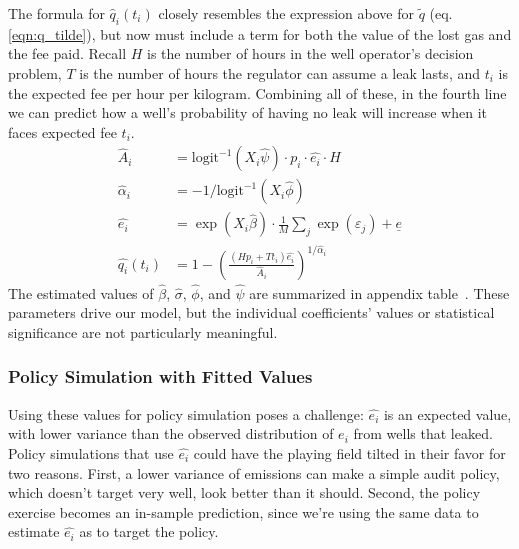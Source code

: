 The formula for \(\hat{q}_i(t_i)\) closely resembles the expression above for \(\tilde{q}\) (eq.\ref{eqn:q_tilde}), but now must include a term for both the value of the lost gas and the fee paid.
Recall \(H\) is the number of hours in the well operator's decision problem, \(T\) is the number of hours the regulator can assume a leak lasts, and \(t_i\) is the expected fee per hour per kilogram.
Combining all of these, in the fourth line we can predict how a well's probability of having no leak will increase when it faces expected fee \(t_i\).
\begin{align}
\hat{A}_i &= \text{logit}^{-1}(X_i \hat{\psi}) \cdot p_i \cdot \hat{e_i} \cdot H \nonumber \\
\hat{\alpha}_i &= -1 / \text{logit}^{-1}(X_i \hat{\phi}) \label{eqn:alpha-fitted} \\
\hat{e_i} &= \exp( X_i \hat{\beta}) \cdot \frac{1}{M}\sum_j \exp(\varepsilon_j) + \underline{e} \nonumber \\
\hat{q_i}(t_i) &= 1 - \left(\frac{(H p_i + T t_i) \hat{e_i}}{\hat{A}_i}\right) ^{1 / \hat{\alpha}_i} \nonumber
\end{align}
The estimated values of \(\hat{\beta}\), \(\hat{\sigma}\),  \(\hat{\phi}\), and \(\hat{\psi}\) are summarized in appendix table~\iftoggle{usexr}{\ref{tab:model-param}}{A3}.
These parameters drive our model, but the individual coefficients' values or statistical significance are not particularly meaningful.

\subsubsection{Policy Simulation with Fitted Values}

Using these values for policy simulation poses a challenge:
\(\hat{e_i}\) is an expected value, with lower variance than the observed distribution of \(e_i\) from wells that leaked.
Policy simulations that use \(\hat{e_i}\) could have the playing field tilted in their favor for two reasons.
First, a lower variance of emissions can make a simple audit policy, which doesn't target very well, look better than it should.
Second, the policy exercise becomes an in-sample prediction, since we're using the same data to estimate \(\hat{e_i}\) as to target the policy.

